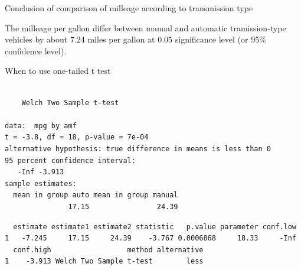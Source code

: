 \begin{frame}{Conclusion of comparison of milleage according to
transmission type}

The milleage per gallon differ between manual and automatic
tramission-type vehicles by about 7.24 miles per gallon at \(0.05\)
significance level (or 95\% confidence level).

\end{frame}

\begin{frame}[fragile]{When to use one-tailed t test}

\begin{Shaded}
\begin{Highlighting}[]
\end{Highlighting}
\end{Shaded}

\begin{Shaded}
\begin{Highlighting}[]
\StringTok{ }\OperatorTok{~}\StringTok{ } \NormalTok{))}
\end{Highlighting}
\end{Shaded}

\begin{verbatim}

    Welch Two Sample t-test

data:  mpg by amf
t = -3.8, df = 18, p-value = 7e-04
alternative hypothesis: true difference in means is less than 0
95 percent confidence interval:
   -Inf -3.913
sample estimates:
  mean in group auto mean in group manual 
               17.15                24.39 
\end{verbatim}

\begin{Shaded}
\end{Shaded}

\begin{verbatim}
  estimate estimate1 estimate2 statistic   p.value parameter conf.low
1   -7.245     17.15     24.39    -3.767 0.0006868     18.33     -Inf
  conf.high                  method alternative
1    -3.913 Welch Two Sample t-test        less
\end{verbatim}

\end{frame}

